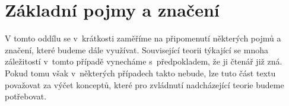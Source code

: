 \section{Základní pojmy a značení}\label{sec:zakladni-pojmy-a-znaceni}

V tomto oddílu se v~krátkosti zaměříme na připomenutí některých pojmů a značení, které budeme dále využívat. Související teorii týkající se mnoha záležitostí v~tomto případě vynecháme s~předpokladem, že ji čtenář již zná. Pokud tomu však v~některých případech takto nebude, lze tuto část textu považovat za výčet konceptů, které pro zvládnutí nadcházející teorie budeme potřebovat.

